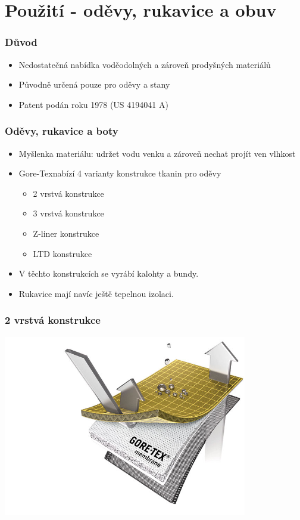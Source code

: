 \section{Použití - oděvy, rukavice a obuv}

\begin{frame}
	\frametitle{Důvod}
	\begin{itemize}
		\item Nedostatečná nabídka voděodolných a zároveň prodyšných materiálů
		\item Původně určená pouze pro oděvy a stany
		\item Patent podán roku 1978 (US 4194041 A)
	\end{itemize}
\end{frame}

\begin{frame}
	\frametitle{Oděvy, rukavice a boty}
	\begin{itemize}
		\item Myšlenka materiálu: udržet vodu venku a zároveň nechat projít ven vlhkost
		\item Gore-Tex\textregistered nabízí 4 varianty konstrukce tkanin pro oděvy
		\begin{itemize}
			\item 2 vrstvá konstrukce %
			\item 3 vrstvá konstrukce %
			\item Z-liner konstrukce %
			\item LTD konstrukce %
		\end{itemize}
	  	\item V těchto konstrukcích se vyrábí kalohty a bundy.
	  	\item Rukavice mají navíc ještě tepelnou izolaci.
	\end{itemize}
\end{frame}

\begin{frame}
	\frametitle{2 vrstvá konstrukce}
			\includegraphics[width=0.8\textwidth]{bunda_close.jpg}
\end{frame}

